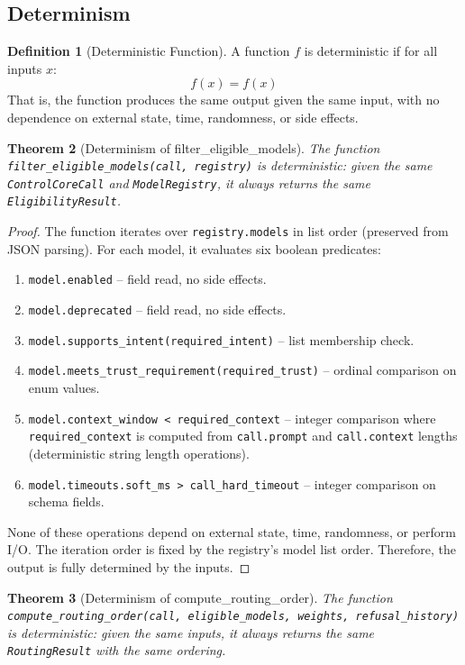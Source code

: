 \documentclass[11pt,a4paper]{article}
\theoremstyle{plain}
\newtheorem{theorem}{Theorem}[section]
\theoremstyle{definition}
\newtheorem{definition}[theorem]{Definition}
\begin{document}
\subsection{Determinism}

\begin{definition}[Deterministic Function]
A function $f$ is deterministic if for all inputs $x$:
\[
  f(x) = f(x)
\]
That is, the function produces the same output given the same input, with no
dependence on external state, time, randomness, or side effects.
\end{definition}

\begin{theorem}[Determinism of filter\_eligible\_models]
\label{thm:dial-determinism}
The function \texttt{filter\_eligible\_models(call, registry)} is deterministic:
given the same \texttt{ControlCoreCall} and \texttt{ModelRegistry}, it always
returns the same \texttt{EligibilityResult}.
\end{theorem}

\begin{proof}
The function iterates over \texttt{registry.models} in list order (preserved
from JSON parsing). For each model, it evaluates six boolean predicates:
\begin{enumerate}
\item \texttt{model.enabled} -- field read, no side effects.
\item \texttt{model.deprecated} -- field read, no side effects.
\item \texttt{model.supports\_intent(required\_intent)} -- list membership check.
\item \texttt{model.meets\_trust\_requirement(required\_trust)} -- ordinal
  comparison on enum values.
\item \texttt{model.context\_window < required\_context} -- integer comparison
  where \texttt{required\_context} is computed from \texttt{call.prompt} and
  \texttt{call.context} lengths (deterministic string length operations).
\item \texttt{model.timeouts.soft\_ms > call\_hard\_timeout} -- integer
  comparison on schema fields.
\end{enumerate}
None of these operations depend on external state, time, randomness, or perform
I/O. The iteration order is fixed by the registry's model list order. Therefore,
the output is fully determined by the inputs.
\end{proof}

\begin{theorem}[Determinism of compute\_routing\_order]
\label{thm:routing-determinism}
The function \texttt{compute\_routing\_order(call, eligible\_models, weights,
refusal\_history)} is deterministic: given the same inputs, it always returns
the same \texttt{RoutingResult} with the same ordering.
\end{theorem}
\end{document}
